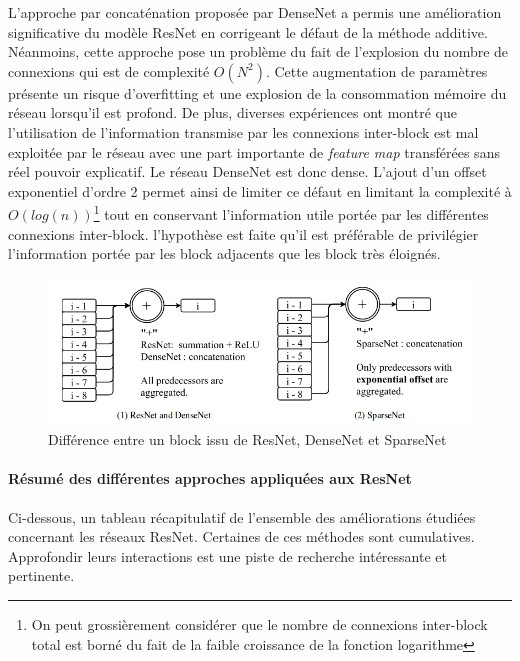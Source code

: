 \noindent L'approche par concaténation proposée par DenseNet a permis une amélioration significative du modèle ResNet en corrigeant le défaut de la méthode additive. Néanmoins, cette approche pose un problème du fait de l'explosion du nombre de connexions qui est de complexité $O(N^2)$. Cette augmentation de paramètres présente un risque d'overfitting et une explosion de la consommation mémoire du réseau lorsqu'il est profond. De plus, diverses expériences ont montré que l'utilisation de l'information transmise par les connexions inter-block est mal exploitée par le réseau avec une part importante de \textit{feature map} transférées sans réel pouvoir explicatif. Le réseau DenseNet est donc  dense. L'ajout d'un offset exponentiel d'ordre 2 permet ainsi de limiter ce défaut en limitant la complexité à $O(log(n))$\footnote{On peut grossièrement considérer que le nombre de connexions inter-block total est borné du fait de la faible croissance de la fonction logarithme} tout en conservant l'information utile portée par les différentes connexions inter-block. l'hypothèse est faite qu'il est préférable de privilégier l'information portée par les block adjacents que les block très éloignés.


\begin{figure}
    \centering
    \includegraphics[scale=0.4]{./tex/convolution-network/classifier/sparsenet.png}
    \caption{Différence entre un block issu de ResNet, DenseNet et SparseNet}
    \label{sparsenet}
\end{figure}

\paragraph{Résumé des différentes approches appliquées aux ResNet}

Ci-dessous, un tableau récapitulatif de l'ensemble des améliorations étudiées concernant les réseaux ResNet. Certaines de ces méthodes sont cumulatives. Approfondir leurs interactions est une piste de recherche intéressante et pertinente.\\

